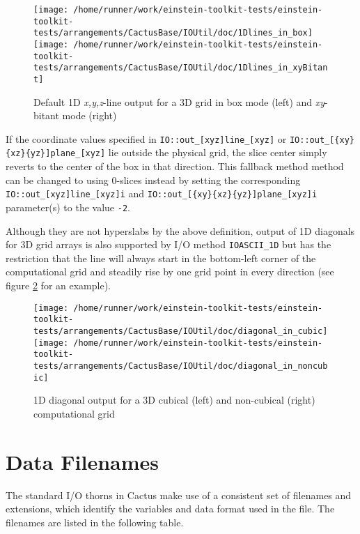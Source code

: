\documentclass{article}
\begin{document}
\begin{figure}[ht]
\begin{center}
\texttt{[image: /home/runner/work/einstein-toolkit-tests/einstein-toolkit-tests/arrangements/CactusBase/IOUtil/doc/1Dlines\_in\_box]}
\texttt{[image: /home/runner/work/einstein-toolkit-tests/einstein-toolkit-tests/arrangements/CactusBase/IOUtil/doc/1Dlines\_in\_xyBitant]}
\end{center}
\caption{Default 1D {\it x,y,z}-line output for a 3D grid in box mode (left) and {\it xy}-bitant mode (right)}
\label{default_1D_output}
\end{figure}

If the coordinate values specified in {\tt IO::out\_[xyz]line\_[xyz]}
or {\tt IO::out\_[\{xy\}\{xz\}\{yz\}]plane\_[xyz]} lie outside the physical
grid, the slice center simply reverts to the center of the box in that
direction. This fallback method method can be changed to using 0-slices instead
by setting the corresponding {\tt IO::out\_[xyz]line\_[xyz]i}
and {\tt IO::out\_[\{xy\}\{xz\}\{yz\}]plane\_[xyz]i} parameter(s) to the value
{\tt -2}.

Although they are not hyperslabs by the above definition, output of 1D diagonals
for 3D grid arrays is also supported by I/O method {\tt IOASCII\_1D} but has the
restriction that the line will always start in the bottom-left corner of the
computational grid and steadily rise by one grid point in every direction (see
figure \ref{default_diagonal_output} for an example).

\begin{figure}[ht]
\begin{center}
\texttt{[image: /home/runner/work/einstein-toolkit-tests/einstein-toolkit-tests/arrangements/CactusBase/IOUtil/doc/diagonal\_in\_cubic]}
\texttt{[image: /home/runner/work/einstein-toolkit-tests/einstein-toolkit-tests/arrangements/CactusBase/IOUtil/doc/diagonal\_in\_noncubic]}
\end{center}
\caption{1D diagonal output for a 3D cubical (left) and non-cubical (right)
computational grid}
\label{default_diagonal_output}
\end{figure}


\section{Data Filenames}

The standard I/O thorns in Cactus make use of a consistent set of filenames
and extensions, which identify the variables and data format used in the file.
The filenames are listed in the following table.
\end{document}
